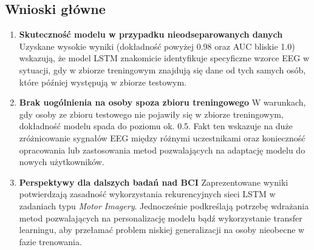 \documentclass[eeg_v4.tex]{subfiles}
\begin{document}
    \subsection*{Wnioski główne}
    \begin{enumerate}
        \item \textbf{Skuteczność modelu w przypadku nieodseparowanych danych}
        Uzyskane wysokie wyniki (dokładność powyżej 0.98 oraz AUC bliskie 1.0) wskazują, że model LSTM znakomicie
        identyfikuje specyficzne wzorce EEG w sytuacji, gdy w zbiorze treningowym znajdują się dane od tych samych osób,
        które później występują w zbiorze testowym.

        \item \textbf{Brak uogólnienia na osoby spoza zbioru treningowego}
        W warunkach, gdy osoby ze zbioru testowego nie pojawiły się w zbiorze treningowym, dokładność modelu spada do
        poziomu
        ok. 0.5. Fakt ten wskazuje na duże zróżnicowanie sygnałów EEG między różnymi uczestnikami oraz konieczność
        opracowania lub zastosowania metod pozwalających na adaptację modelu do nowych użytkowników.

        \item \textbf{Perspektywy dla dalszych badań nad BCI}
        Zaprezentowane wyniki potwierdzają zasadność wykorzystania rekurencyjnych sieci LSTM w zadaniach typu
        \textit{Motor Imagery}. Jednocześnie podkreślają potrzebę wdrażania metod pozwalających na personalizację modelu
        bądź wykorzystanie transfer learningu, aby przełamać problem niskiej generalizacji na osoby nieobecne w fazie
        trenowania.
    \end{enumerate}
\end{document}

